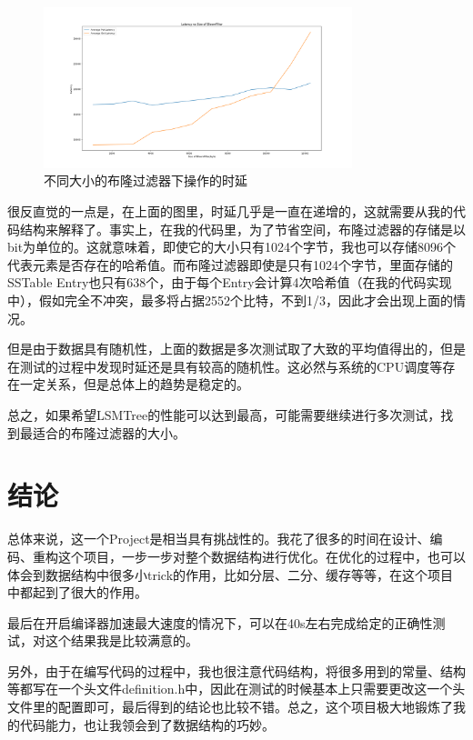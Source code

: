 \documentclass{article}
\begin{document}
\begin{figure}[h]
    \centering
    \includegraphics[width=0.8\textwidth]{images/filter.png}
    \caption{不同大小的布隆过滤器下操作的时延}
    \label{filter}
\end{figure}

很反直觉的一点是，在上面的图里，时延几乎是一直在递增的，这就需要从我的代码结构来解释了。事实上，在我的代码里，为了节省空间，布隆过滤器的存储是以bit为单位的。这就意味着，即使它的大小只有1024个字节，我也可以存储8096个代表元素是否存在的哈希值。而布隆过滤器即使是只有1024个字节，里面存储的SSTable Entry也只有638个，由于每个Entry会计算4次哈希值（在我的代码实现中），假如完全不冲突，最多将占据2552个比特，不到1/3，因此才会出现上面的情况。

但是由于数据具有随机性，上面的数据是多次测试取了大致的平均值得出的，但是在测试的过程中发现时延还是具有较高的随机性。这必然与系统的CPU调度等存在一定关系，但是总体上的趋势是稳定的。

总之，如果希望LSMTree的性能可以达到最高，可能需要继续进行多次测试，找到最适合的布隆过滤器的大小。

\section{结论}

总体来说，这一个Project是相当具有挑战性的。我花了很多的时间在设计、编码、重构这个项目，一步一步对整个数据结构进行优化。在优化的过程中，也可以体会到数据结构中很多小trick的作用，比如分层、二分、缓存等等，在这个项目中都起到了很大的作用。

最后在开启编译器加速最大速度的情况下，可以在40s左右完成给定的正确性测试，对这个结果我是比较满意的。

另外，由于在编写代码的过程中，我也很注意代码结构，将很多用到的常量、结构等都写在一个头文件definition.h中，因此在测试的时候基本上只需要更改这一个头文件里的配置即可，最后得到的结论也比较不错。总之，这个项目极大地锻炼了我的代码能力，也让我领会到了数据结构的巧妙。
\end{document}
